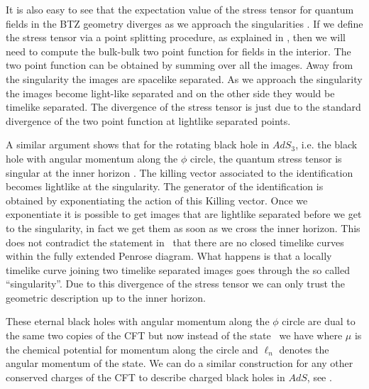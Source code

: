 It is also easy to see that the expectation value of the stress tensor
for quantum fields in the BTZ  geometry  diverges as we approach the 
singularities .
 If we define the stress tensor via a point splitting 
procedure, as explained in \curvedqft  , then we will 
need to compute the bulk-bulk 
 two point function for fields in the interior. 
The  two point function can be obtained  by summing over all the images. 
Away from the singularity the images are spacelike separated. As 
we approach the singularity the images become light-like separated
and on the other side they would be timelike separated. The divergence
of the stress tensor is just due to the standard divergence of the
two point function at lightlike separated points. 


A similar argument shows that for the rotating black hole in $AdS_3$, 
i.e. the black hole with angular 
momentum along the $\phi$ circle,  the quantum 
stress tensor is singular at the inner horizon \steif .  The 
killing vector associated  to  the identification becomes lightlike at
the singularity. The generator of the identification is obtained by 
exponentiating the action of this Killing vector. 
Once we exponentiate it is possible to 
get images that are lightlike separated before we get to the singularity, 
in fact we get them as soon as we cross the inner horizon. 
This does not contradict the statement
in \btzpaper\ that there are no 
 closed timelike curves within the fully extended Penrose diagram.
 What happens is that 
a locally timelike curve  joining two timelike separated images 
 goes through the
so called ``singularity''. Due to this  divergence of the stress tensor 
 we can only trust the geometric description up to the inner horizon.


These eternal black holes with angular momentum along the $\phi$ circle 
are dual to the same two copies of the CFT but now instead of the
state \wavefunction\ we have 
\eqn{}
where $\mu$ is the chemical potential for momentum along the circle and
$\ell_n$ denotes the angular momentum of the state. 
We can do a similar construction for any other conserved charges of the 
CFT to describe charged  black holes in $AdS$, see \israel .


